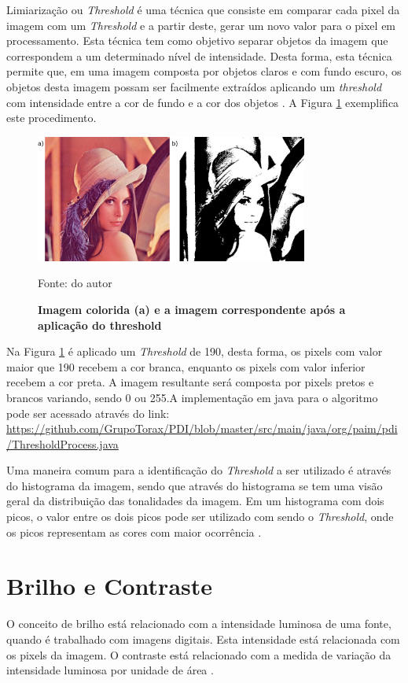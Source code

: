 \documentclass[
	12pt,				%
	oneside,			%
	a4paper,			%
	english,			%
	french,				%
	spanish,			%
	brazil,				%
	]{abntex2}
\begin{document}
Limiarização ou \textit{Threshold} é uma técnica que consiste em comparar cada pixel da imagem com um \textit{Threshold} e a partir deste, gerar um novo valor para o pixel em processamento. Esta técnica tem como objetivo separar objetos da imagem que correspondem a um determinado nível de intensidade. Desta forma, esta técnica permite que, em uma imagem composta por objetos claros e com fundo escuro, os objetos desta imagem possam ser facilmente extraídos aplicando um \textit{threshold} com intensidade entre a cor de fundo e a cor dos objetos \cite{gonzalesWoods:2008}. A Figura \ref{fig:limiarizacaofig} exemplifica este procedimento.

\begin{figure}[ht]
\centering

\caption{\textbf{Imagem colorida (a) e a imagem correspondente após a aplicação do threshold}}
\includegraphics[width=0.8\textwidth]{imagens/limiarizacao.png}

Fonte: do autor
\label{fig:limiarizacaofig}
\end{figure}

Na Figura \ref{fig:limiarizacaofig} é aplicado um \textit{Threshold} de 190, desta forma, os pixels com valor maior que 190 recebem a cor branca, enquanto os pixels com valor inferior recebem a cor preta. A imagem resultante será composta por pixels pretos e brancos variando, sendo 0 ou 255.A implementação em java para o algoritmo pode ser acessado através do link:
\url{https://github.com/GrupoTorax/PDI/blob/master/src/main/java/org/paim/pdi/ThresholdProcess.java}

Uma maneira comum para a identificação do \textit{Threshold} a ser utilizado é através do histograma da imagem, sendo que através do histograma se tem uma visão geral da distribuição das tonalidades da imagem. Em um histograma com dois picos, o valor entre os dois picos pode ser utilizado com sendo o \textit{Threshold}, onde os picos representam as cores com maior ocorrência  \cite{gonzalesWoods:2008}. 

\section{Brilho e Contraste}
O conceito de brilho está relacionado com a intensidade luminosa de uma fonte, quando é trabalhado com imagens digitais. Esta intensidade está relacionada com os pixels da imagem. O contraste está relacionado com a medida de variação da intensidade luminosa por unidade de área \cite{gonzalesWoods:2008}.
\end{document}
